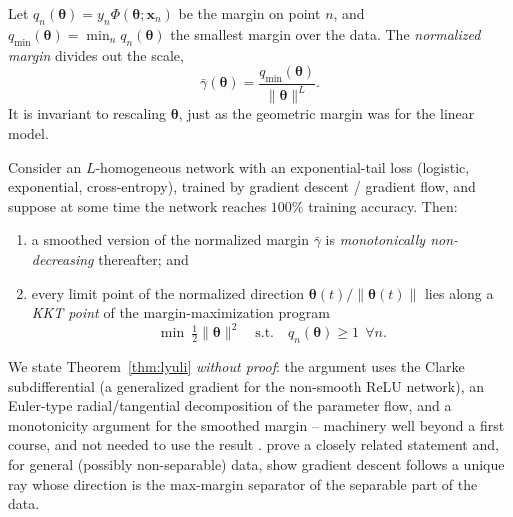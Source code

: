 \begin{definition}
Let $q_n(\boldsymbol\theta) = y_n\Phi(\boldsymbol\theta;\mathbf{x}_n)$ be
the margin on point $n$, and $q_{\min}(\boldsymbol\theta)
= \min_n q_n(\boldsymbol\theta)$ the smallest margin over the data. The
\emph{normalized margin} divides out the scale,
\[
  \bar\gamma(\boldsymbol\theta)
  = \frac{q_{\min}(\boldsymbol\theta)}{\|\boldsymbol\theta\|^{L}}.
\]
It is invariant to rescaling $\boldsymbol\theta$, just as the geometric
margin was for the linear model.
\end{definition}

\begin{theorem}
\label{thm:lyuli}
Consider an $L$-homogeneous network with an exponential-tail loss
(logistic, exponential, cross-entropy), trained by gradient descent /
gradient flow, and suppose at some time the network reaches $100\%$
training accuracy. Then:
\begin{enumerate}[label=(\alph*),nosep]
\item a smoothed version of the normalized margin $\bar\gamma$ is
  \emph{monotonically non-decreasing} thereafter; and
\item every limit point of the normalized direction
  $\boldsymbol\theta(t)/\|\boldsymbol\theta(t)\|$ lies along a
  \emph{KKT point} of the margin-maximization program
  \[
    \min \ \tfrac12\|\boldsymbol\theta\|^2
    \quad\text{s.t.}\quad q_n(\boldsymbol\theta)\ge 1 \ \ \forall n.
  \]
\end{enumerate}
\end{theorem}

We state Theorem~\ref{thm:lyuli} \emph{without proof}: the argument uses
the Clarke subdifferential (a generalized gradient for the non-smooth ReLU
network), an Euler-type radial/tangential decomposition of the parameter
flow, and a monotonicity argument for the smoothed margin -- machinery
well beyond a first course, and not needed to use the result
\citep{lyuli2020}. \citet{jitelgarsky2019} prove a closely related
statement and, for general (possibly non-separable) data, show gradient
descent follows a unique ray whose direction is the max-margin separator
of the separable part of the data.

